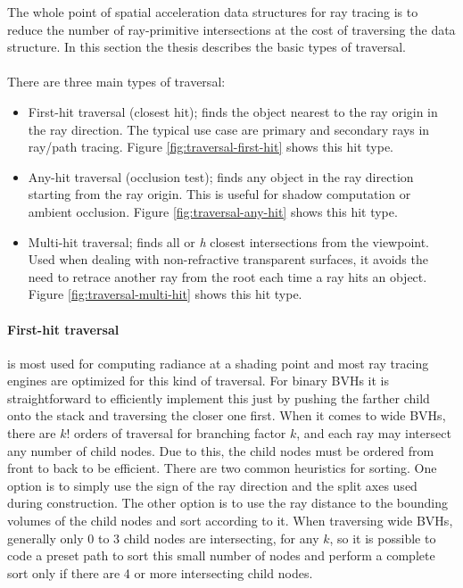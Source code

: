 The whole point of spatial acceleration data structures for ray tracing is to reduce the number of ray-primitive intersections at the cost of traversing the data structure. In this section the thesis describes the basic types of traversal.

\newpage
\paragraph{}There are three main types of traversal:
\begin{itemize}
    \item First-hit traversal (closest hit); finds the object nearest to the ray origin in the ray direction. The typical use case are primary and secondary rays in ray/path tracing. Figure \ref{fig:traversal-first-hit} shows this hit type.
    \item Any-hit traversal (occlusion test); finds any object in the ray direction starting from the ray origin. This is useful for shadow computation or ambient occlusion. Figure \ref{fig:traversal-any-hit} shows this hit type.
    \item Multi-hit traversal; finds all or \textit{h} closest intersections from the viewpoint. Used when dealing with non-refractive transparent surfaces, it avoids the need to retrace another ray from the root each time a ray hits an object. Figure \ref{fig:traversal-multi-hit} shows this hit type.
\end{itemize}

\paragraph{First-hit traversal} is most used for computing radiance at a shading point and most ray tracing engines are optimized for this kind of traversal. For binary BVHs it is straightforward to efficiently implement this just by pushing the farther child onto the stack and traversing the closer one first. When it comes to wide BVHs, there are $k!$ orders of traversal for branching factor $k$, and each ray may intersect any number of child nodes. Due to this, the child nodes must be ordered from front to back to be efficient. There are two common heuristics for sorting. One option is to simply use the sign of the ray direction and the split axes used during construction. The other option is to use the ray distance to the bounding volumes of the child nodes and sort according to it. When traversing wide BVHs, generally only 0 to 3 child nodes are intersecting, for any $k$, so it is possible to code a preset path to sort this small number of nodes and perform a complete sort only if there are 4 or more intersecting child nodes. \cite{Meister2021}

